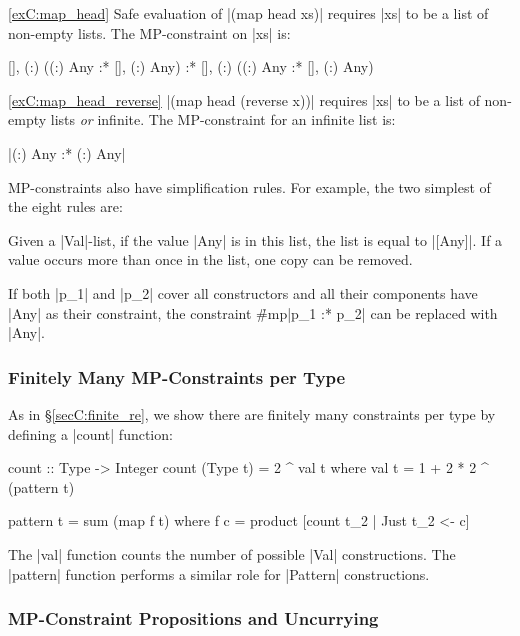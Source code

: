 \begin{examplerevisit}{\ref{exC:map_head}} Safe evaluation of |(map head xs)| requires |xs| to be a list of non-empty lists. The MP-constraint on |xs| is:

\ignore\begin{code}
{[], (:) ({(:) Any} :* {[], (:) Any})} :*
{[], (:) ({(:) Any} :* {[], (:) Any})}
\end{code}
\end{examplerevisit}

\begin{examplerevisit}{\ref{exC:map_head_reverse}} |(map head (reverse x))| requires |xs| to be a list of non-empty lists \textit{or} infinite. The MP-constraint for an infinite list is: \ignore|{(:) Any} :* {(:) Any}|
\end{examplerevisit}

\bigskip

MP-constraints also have simplification rules.  For example, the two simplest of the eight rules are:

 Given a |Val|-list, if the value |Any| is in this list, the list is equal to |[Any]|. If a value occurs more than once in the list, one copy can be removed.

 If both |p_1| and |p_2| cover all constructors and all their components have |Any| as their constraint, the constraint \h{#mp}|p_1 :* p_2| can be replaced with |Any|.


\subsubsection{Finitely Many MP-Constraints per Type}

As in \S\ref{secC:finite_re}, we show there are finitely many constraints per type by defining a |count| function:

\begin{code}
count :: Type -> Integer
count (Type t) = 2 ^ val t
    where val t = 1 + 2 * 2 ^ (pattern t)

pattern t = sum (map f t)
    where f c = product [count t_2 | Just t_2 <- c]
\end{code}

The |val| function counts the number of possible |Val| constructions. The |pattern| function performs a similar role for |Pattern| constructions.


\subsubsection{MP-Constraint Propositions and Uncurrying}

